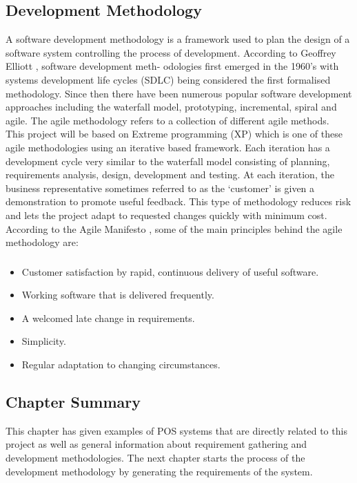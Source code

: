 \documentclass[12pt,a4paper]{article}
\begin{document}
\subsection{Development Methodology}
	\label{dev:agile}
	A software development methodology is a framework used to plan the design of a software system
controlling the process of development. According to Geoffrey Elliott \cite{Ref:2}, software development meth-
odologies first emerged in the 1960’s with systems development life cycles (SDLC) being considered
the first formalised methodology. Since then there have been numerous popular software development
approaches including the waterfall model, prototyping, incremental, spiral and agile.
The agile methodology refers to a collection of different agile methods.\\
This project will be based
on Extreme programming (XP) which is one of these agile methodologies using an iterative based
framework. Each iteration has a development cycle very similar to the waterfall model consisting
of planning, requirements analysis, design, development and testing. At each iteration, the business
representative sometimes referred to as the ‘customer’ is given a demonstration to promote useful
feedback. This type of methodology reduces risk and lets the project adapt to requested changes
quickly with minimum cost.\\
According to the Agile Manifesto \cite{Ref:3}, some of the main principles behind the agile methodology
are:
	\subsubsection{}
		\begin{itemize}
			\item Customer satisfaction by rapid, continuous delivery of useful software.
			\item Working software that is delivered frequently.
			\item A welcomed late change in requirements.
			\item Simplicity.
			\item Regular adaptation to changing circumstances.
		\end{itemize}

\subsection{Chapter Summary}
	
	This chapter has given examples of POS systems that are directly related to this project as well as
general information about requirement gathering and development methodologies. The next chapter
starts the process of the development methodology by generating the requirements of the system.
\newpage
\end{document}
